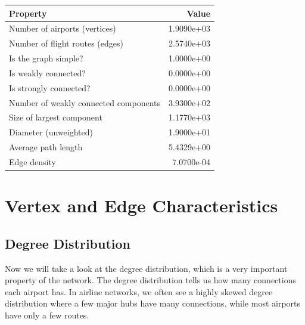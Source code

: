 \documentclass[
  letterpaper,
]{report}
\begin{document}
\begin{longtable}[]{@{}lr@{}}
\toprule\noalign{}
Property & Value \\
\midrule\noalign{}
\endhead
\bottomrule\noalign{}
\endlastfoot
Number of airports (vertices) & 1.9090e+03 \\
Number of flight routes (edges) & 2.5740e+03 \\
Is the graph simple? & 1.0000e+00 \\
Is weakly connected? & 0.0000e+00 \\
Is strongly connected? & 0.0000e+00 \\
Number of weakly connected components & 3.9300e+02 \\
Size of largest component & 1.1770e+03 \\
Diameter (unweighted) & 1.9000e+01 \\
Average path length & 5.4329e+00 \\
Edge density & 7.0700e-04 \\
\end{longtable}

\section{Vertex and Edge
Characteristics}\label{vertex-and-edge-characteristics}

\subsection{Degree Distribution}\label{degree-distribution}

Now we will take a look at the degree distribution, which is a very
important property of the network. The degree distribution tells us how
many connections each airport has. In airline networks, we often see a
highly skewed degree distribution where a few major hubs have many
connections, while most airports have only a few routes.
\end{document}
